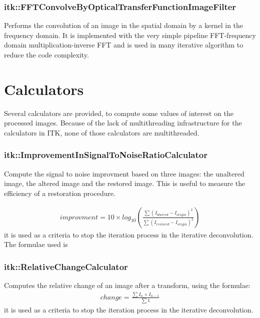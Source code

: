 \documentclass{InsightArticle}
\begin{document}
\subsubsection{itk::FFTConvolveByOpticalTransferFunctionImageFilter}

Performs the convolution of an image in the spatial domain by a kernel in the frequency domain. It is implemented with the very
simple pipeline FFT-frequency domain multiplication-inverse FFT and is used in many iterative algorithm to reduce the code
complexity.

\section{Calculators}

Several calculators are provided, to compute some values of interest on the processed images.
Because of the lack of multithreading infrastructure for the calculators in ITK, none of those calculators are
multithreaded.

\subsubsection{itk::ImprovementInSignalToNoiseRatioCalculator}

Compute the signal to noise improvment based on three images: the unaltered image, the altered image and the restored image.
This is useful to measure the efficiency of a restoration procedure.

\begin{eqnarray}
\label{eq:imageFormation}
improvment = 10 \times log_{10}\left(\frac{\sum (I_{blurred} - I_{origin} )^2}{\sum (I_{restored} - I_{origin} )^2}\right)
\end{eqnarray}
it is used as a criteria to stop the iteration process in the iterative deconvolution.
The formulae used is


\subsubsection{itk::RelativeChangeCalculator}

Computes the relative change of an image after a transform, using the formulae:
\begin{eqnarray}
\label{eq:imageFormation}
change = \frac{\sum I_n \times I_{n-1}}{\sum 1}
\end{eqnarray}
it is used as a criteria to stop the iteration process in the iterative deconvolution.
\end{document}

